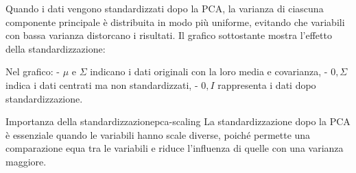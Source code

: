 Quando i dati vengono standardizzati dopo la PCA, la varianza di ciascuna componente principale è distribuita in modo più uniforme, evitando che variabili con bassa varianza distorcano i risultati. Il grafico sottostante mostra l'effetto della standardizzazione:

Nel grafico:
- \( \mu \) e \( \Sigma \) indicano i dati originali con la loro media e covarianza,
- \( 0, \Sigma \) indica i dati centrati ma non standardizzati,
- \( 0, I \) rappresenta i dati dopo standardizzazione.

\begin{nota}{Importanza della standardizzazione}{pca-scaling}
La standardizzazione dopo la PCA è essenziale quando le variabili hanno scale diverse, poiché permette una comparazione equa tra le variabili e riduce l'influenza di quelle con una varianza maggiore.
\end{nota}
